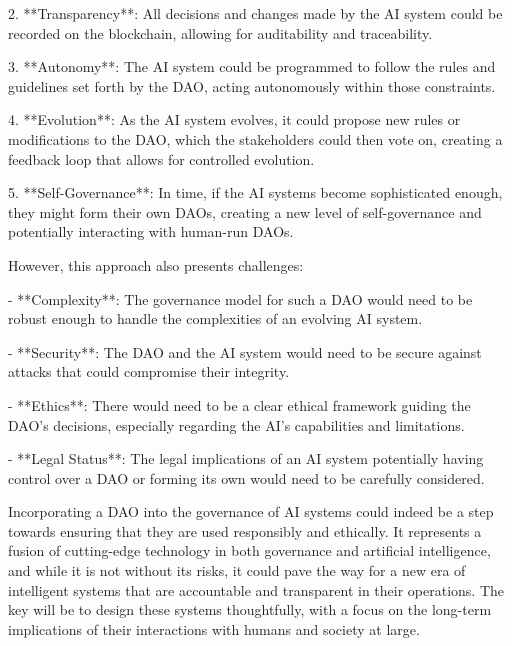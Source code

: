 \documentclass{article}
\begin{document}
2. **Transparency**: All decisions and changes made by the AI system could be recorded on the blockchain, allowing for auditability and traceability.

3. **Autonomy**: The AI system could be programmed to follow the rules and guidelines set forth by the DAO, acting autonomously within those constraints.

4. **Evolution**: As the AI system evolves, it could propose new rules or modifications to the DAO, which the stakeholders could then vote on, creating a feedback loop that allows for controlled evolution.

5. **Self-Governance**: In time, if the AI systems become sophisticated enough, they might form their own DAOs, creating a new level of self-governance and potentially interacting with human-run DAOs.

However, this approach also presents challenges:

- **Complexity**: The governance model for such a DAO would need to be robust enough to handle the complexities of an evolving AI system.

- **Security**: The DAO and the AI system would need to be secure against attacks that could compromise their integrity.

- **Ethics**: There would need to be a clear ethical framework guiding the DAO's decisions, especially regarding the AI's capabilities and limitations.

- **Legal Status**: The legal implications of an AI system potentially having control over a DAO or forming its own would need to be carefully considered.

Incorporating a DAO into the governance of AI systems could indeed be a step towards ensuring that they are used responsibly and ethically. It represents a fusion of cutting-edge technology in both governance and artificial intelligence, and while it is not without its risks, it could pave the way for a new era of intelligent systems that are accountable and transparent in their operations. The key will be to design these systems thoughtfully, with a focus on the long-term implications of their interactions with humans and society at large.


 
\end{document}
